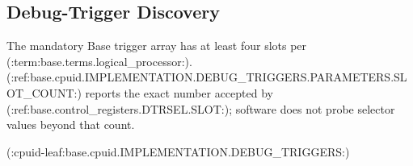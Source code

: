 \subsection{Debug-Trigger Discovery}
The mandatory Base trigger array has at least four slots per (:term:base.terms.logical_processor:).
(:ref:base.cpuid.IMPLEMENTATION.DEBUG_TRIGGERS.PARAMETERS.SLOT_COUNT:) reports the exact number accepted by (:ref:base.control_registers.DTRSEL.SLOT:); software does not probe selector values
beyond that count.

(:cpuid-leaf:base.cpuid.IMPLEMENTATION.DEBUG_TRIGGERS:)
